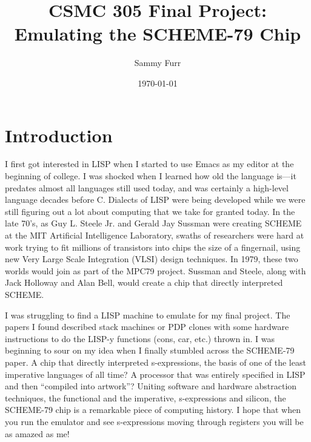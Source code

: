 \documentclass[12pt]{article}
\author{Sammy Furr}
\title{CSMC 305 Final Project: Emulating the SCHEME-79 Chip}
\date{\today}
\begin{document}
\begin{titlepage}
\maketitle
\end{titlepage}
\section{Introduction}
I first got interested in LISP when I started to use Emacs as my
editor at the beginning of college.  I was shocked when I learned how
old the language is---it predates almost all languages still used
today, and was certainly a high-level language decades before
C\cite{lisp}.  Dialects of LISP were being developed while we were
still figuring out a lot about computing that we take for granted
today.  In the late 70's, as Guy L. Steele Jr. and Gerald Jay Sussman
were creating SCHEME at the MIT Artificial Intelligence Laboratory,
swaths of researchers were hard at work trying to fit millions of
transistors into chips the size of a fingernail, using new Very Large
Scale Integration (VLSI) design techniques.  In 1979, these two worlds
would join as part of the MPC79 project\cite{mpc79}.  Sussman and Steele, along
with Jack Holloway and Alan Bell, would create a chip that directly
interpreted SCHEME.\cite{s79}\par
I was struggling to find a LISP machine to emulate for my final
project.  The papers I found described stack machines or PDP clones
with some hardware instructions to do the LISP-y functions (cons, car,
etc.) thrown in.  I was beginning to sour on my idea when I finally
stumbled across the SCHEME-79 paper. A chip that directly interpreted
s-expressions, the basis of one of the least imperative languages of
all time?  A processor that was entirely specified in LISP and then
``compiled into artwork''\cite[12]{s79}?  Uniting software and
hardware abstraction techniques, the functional and the imperative,
s-expressions and silicon, the SCHEME-79 chip is a remarkable piece of
computing history.  I hope that when you run the emulator and see
s-expressions moving through registers you will be as amazed as me!
\end{document}

